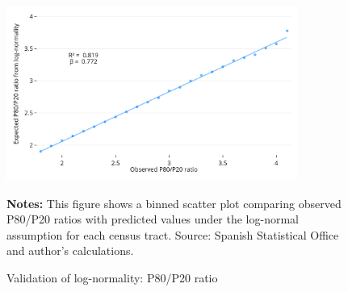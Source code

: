 \begin{figure}[H]
\begin{center}
\captionsetup{justification=centering}
\caption{Validation of log-normality: P80/P20 ratio}
\label{fig:p80p20}
\includegraphics[width=0.85\textwidth]{output/binned_scatter_p80p20_2023.png}
\end{center}
\begin{fignotes2}
\textbf{Notes:} This figure shows a binned scatter plot comparing observed P80/P20 ratios with predicted values under the log-normal assumption for each census tract. Source: Spanish Statistical Office and author's calculations.
\end{fignotes2}
\end{figure}


